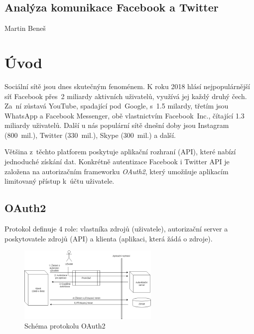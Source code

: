 \documentclass[10pt,a4paper,titlepage]{article}
\begin{document}

  \begin{center}
    \section*{Analýza komunikace Facebook a Twitter}
    Martin Beneš
  \end{center}

  \section*{Úvod}
  Sociální sítě jsou dnes skutečným fenoménem. K roku 2018 hlásí nejpopulárnější
  síť Facebook přes~2 miliardy aktivních uživatelů, využívá jej každý druhý čech.
  Za~ní zůstavá YouTube, spadající pod~Google, s~1.5 milardy,
  třetím jsou WhatsApp a Facebook Messenger, obě vlastnictvím Facebook~Inc.,
  čítající 1.3 miliardy uživatelů. Další u nás populární sítě dnešní doby
  jsou Instagram (800~mil.), Twitter (330~mil.), Skype (300~mil.) a další. \cite{UserCount}


  Většina z~těchto platforem poskytuje aplikační rozhraní (API), které nabízí
  jednoduché získání dat. Konkrétně autentizace Facebook i Twitter API je
  založena na autorizačním frameworku {\it OAuth2}, který umožňuje
  aplikacím limitovaný přístup k~účtu uživatele. \cite{FacebookOauth} \cite{TwitterOauth}

  \subsection*{OAuth2}
  Protokol definuje 4 role: vlastníka zdrojů (uživatele), autorizační server
  a poskytovatele zdrojů (API) a klienta (aplikaci, která žádá o zdroje).

  \begin{figure}[h!]
    \begin{center}
      \includegraphics[width=0.6\textwidth]{oauth2.png}
      \caption[title=Obrazek]{Schéma protokolu OAuth2\label{fig:oauth2}}
    \end{center}    
  \end{figure}
\end{document}
